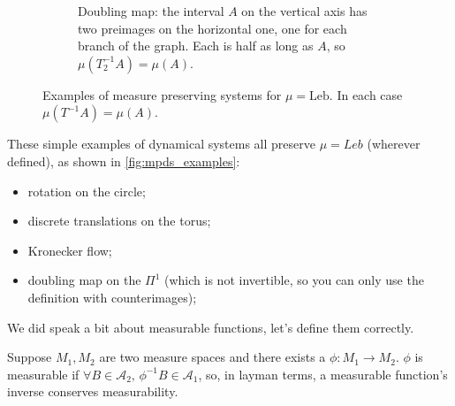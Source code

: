 \begin{figure}[ht]
\begin{subfigure}[t]{0.48\textwidth}
        \caption{Doubling map: the interval $A$ on the vertical axis has two preimages on the horizontal one, one for each branch of the graph. Each is half as long as $A$, so $\mu(T_2^{-1}A)=\mu(A)$.}
        \label{fig:mpds_d}
    \end{subfigure}

    \caption{Examples of measure preserving systems for $\mu=\mathrm{Leb}$. In each case
    $\mu(T^{-1}A)=\mu(A)$.}
    \label{fig:mpds_examples}
\end{figure}

\begin{example}
    These simple examples of dynamical systems all preserve $\mu=Leb$ (wherever defined), as shown in \autoref{fig:mpds_examples}: \begin{itemize}
    \item rotation on the circle;
    \item discrete translations on the torus;
    \item Kronecker flow;
    \item doubling map on the $\Pi^1$ (which is not invertible, so you can only use the definition with counterimages);
\end{itemize}
\end{example}

We did speak a bit about measurable functions, let's define them correctly.

\begin{definition}
    Suppose  $M_1, M_2$ are two measure spaces and there exists a $\phi:M_1\rightarrow M_2$. $\phi$ is measurable if $\forall B\in\mathcal{A}_2,\, \phi^{-1}B\in\mathcal{A}_1$, so, in layman terms, a measurable function's inverse conserves measurability.
\end{definition}

